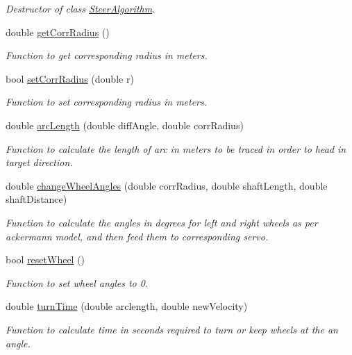 \begin{DoxyCompactItemize}
\begin{DoxyCompactList}\small\item\em Destructor of class \hyperlink{class_steer_algorithm}{Steer\+Algorithm}. \end{DoxyCompactList}\item 
double \hyperlink{class_steer_algorithm_a3ab412260c2457994f1180623862584b}{get\+Corr\+Radius} ()
\begin{DoxyCompactList}\small\item\em Function to get corresponding radius in meters. \end{DoxyCompactList}\item 
bool \hyperlink{class_steer_algorithm_a2314874a6f7252823e994e0e8b0a6b38}{set\+Corr\+Radius} (double r)
\begin{DoxyCompactList}\small\item\em Function to set corresponding radius in meters. \end{DoxyCompactList}\item 
double \hyperlink{class_steer_algorithm_a17ff78af17e900f752237d274bcf751d}{arc\+Length} (double diff\+Angle, double corr\+Radius)
\begin{DoxyCompactList}\small\item\em Function to calculate the length of arc in meters to be traced in order to head in target direction. \end{DoxyCompactList}\item 
double \hyperlink{class_steer_algorithm_a6067af69593713f561890ae8ad23f5ff}{change\+Wheel\+Angles} (double corr\+Radius, double shaft\+Length, double shaft\+Distance)
\begin{DoxyCompactList}\small\item\em Function to calculate the angles in degrees for left and right wheels as per ackermann model, and then feed them to corresponding servo. \end{DoxyCompactList}\item 
bool \hyperlink{class_steer_algorithm_ab251b6fd1f88fb7a526b0d55cd12625b}{reset\+Wheel} ()
\begin{DoxyCompactList}\small\item\em Function to set wheel angles to 0. \end{DoxyCompactList}\item 
double \hyperlink{class_steer_algorithm_aefdb433f65c47bf6e0d6af5de98c8f5a}{turn\+Time} (double arclength, double new\+Velocity)
\begin{DoxyCompactList}\small\item\em Function to calculate time in seconds required to turn or keep wheels at the an angle. \end{DoxyCompactList}\end{DoxyCompactItemize}

